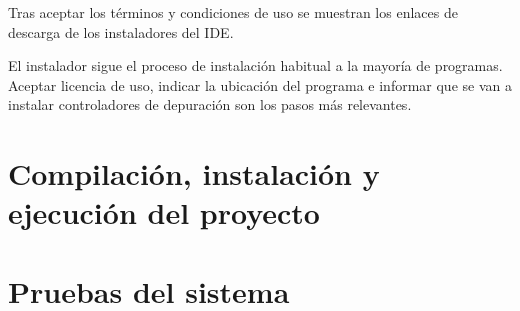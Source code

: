 Tras aceptar los términos y condiciones de uso se muestran los enlaces de
descarga de los instaladores del IDE. 


El instalador sigue el proceso de instalación habitual a la mayoría de programas.
Aceptar licencia de uso, indicar la ubicación del programa e informar
que se van a instalar controladores de depuración son los pasos más relevantes.

\cleardoublepage
\section{Compilación, instalación y ejecución del proyecto}

\section{Pruebas del sistema}
